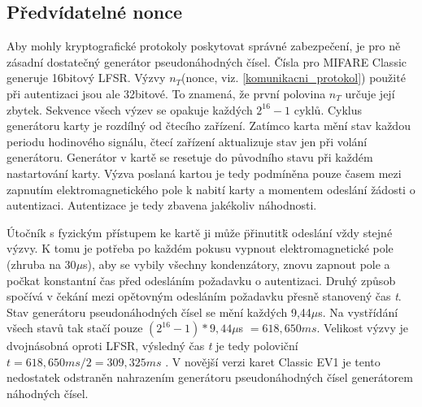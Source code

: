 \subsection{Předvídatelné nonce}
Aby mohly kryptografické protokoly poskytovat správné zabezpečení, je pro ně zásadní dostatečný generátor pseudonáhodných čísel. Čísla pro MIFARE Classic generuje 16bitový LFSR. Výzvy $n_T$(nonce, viz. \ref{komunikacni_protokol}) použité při autentizaci jsou ale 32bitové. To znamená, že první polovina $n_T$ určuje její zbytek. Sekvence všech výzev se opakuje každých $2^{16} - 1$ cyklů\cite{Cryptanalisis}. Cyklus generátoru karty je rozdílný od čtecího zařízení. Zatímco karta mění stav každou periodu hodinového signálu, čtecí zařízení aktualizuje stav jen při volání generátoru\cite{Dismantling_Mifare_Classic}. Generátor v kartě se resetuje do původního stavu při každém nastartování karty. Výzva poslaná kartou je tedy podmíněna pouze časem mezi zapnutím elektromagnetického pole k nabití karty a momentem odeslání žádosti o autentizaci. Autentizace je tedy zbavena jakékoliv náhodnosti. \par
Útočník s fyzickým přístupem ke kartě ji může \"přinutit\" k odeslání vždy stejné výzvy. K tomu je potřeba po každém pokusu vypnout elektromagnetické pole (zhruba na 30$\mu$s), aby se vybily všechny kondenzátory, znovu zapnout pole a počkat konstantní čas před odesláním požadavku o autentizaci. Druhý způsob spočívá v čekání mezi opětovným odesláním požadavku přesně stanovený čas \emph{t}. Stav generátoru pseudonáhodných čísel se mění každých 9,44$\mu$s. Na vystřídání všech stavů tak stačí pouze $(2^{16} - 1) * 9,44\mu$s $= 618,650ms$. Velikost výzvy je dvojnásobná oproti LFSR, výsledný čas \emph{t} je tedy poloviční $t = 618,650ms/2 = 309,325ms$ \cite{Wirelessly_Pickpocketing}. V novější verzi karet Classic EV1 je tento nedostatek odstraněn nahrazením generátoru pseudonáhodných čísel generátorem náhodných čísel\cite{MIFARE_Classic_Official_about}.


